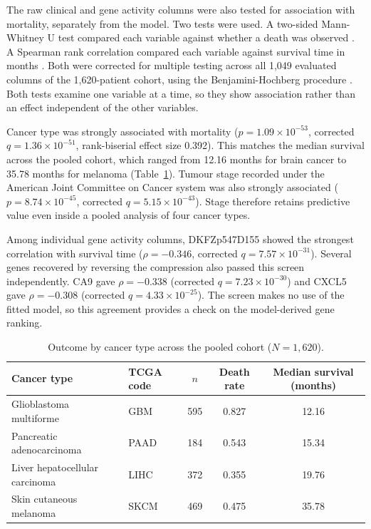 \documentclass[10pt,a4paper]{article}
\begin{document}
The raw clinical and gene activity columns were also tested for association with
mortality, separately from the model. Two tests were used. A two-sided
Mann-Whitney U test compared each variable against whether a death was observed
\citep{mann1947test}. A Spearman rank correlation compared each variable against
survival time in months \citep{spearman1904proof}. Both were corrected for
multiple testing across all 1,049 evaluated columns of the 1,620-patient cohort,
using the Benjamini-Hochberg procedure \citep{benjamini1995controlling}. Both
tests examine one variable at a time, so they show association rather than an
effect independent of the other variables.

Cancer type was strongly associated with mortality
($p = 1.09 \times 10^{-53}$, corrected $q = 1.36 \times 10^{-51}$, rank-biserial
effect size 0.392). This matches the median survival across the pooled cohort,
which ranged from 12.16 months for brain cancer to 35.78 months for melanoma
(Table~\ref{tab:cancer_outcomes}). Tumour stage recorded under the American
Joint Committee on Cancer system was also strongly associated
($p = 8.74 \times 10^{-45}$, corrected $q = 5.15 \times 10^{-43}$). Stage
therefore retains predictive value even inside a pooled analysis of four cancer
types.

Among individual gene activity columns, DKFZp547D155 showed the strongest
correlation with survival time ($\rho = -0.346$, corrected
$q = 7.57 \times 10^{-31}$). Several genes recovered by reversing the
compression also passed this screen independently. CA9 gave $\rho = -0.338$
(corrected $q = 7.23 \times 10^{-30}$) and CXCL5 gave $\rho = -0.308$
(corrected $q = 4.33 \times 10^{-25}$). The screen makes no use of the fitted
model, so this agreement provides a check on the model-derived gene ranking.

\begin{table}[!htbp]
\centering
\caption{Outcome by cancer type across the pooled cohort ($N = 1{,}620$).}
\label{tab:cancer_outcomes}
\begin{tabular}{llccc}
\toprule
Cancer type & TCGA code & $n$ & Death rate & Median survival (months) \\
\midrule
Glioblastoma multiforme      & GBM  & 595 & 0.827 & 12.16 \\
Pancreatic adenocarcinoma    & PAAD & 184 & 0.543 & 15.34 \\
Liver hepatocellular carcinoma & LIHC & 372 & 0.355 & 19.76 \\
Skin cutaneous melanoma      & SKCM & 469 & 0.475 & 35.78 \\
\bottomrule
\end{tabular}
\end{table}
\end{document}
